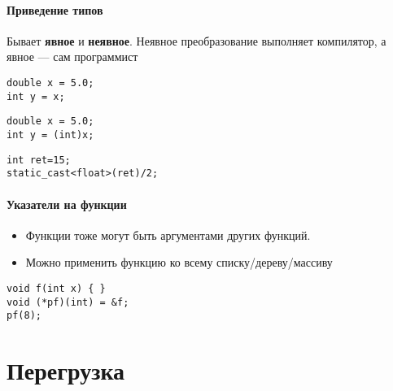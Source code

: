 \documentclass {article}
\begin{document}
\paragraph{Приведение типов\\}
Бывает {\bfseries явное} и {\bfseries неявное}. Неявное преобразование выполняет компилятор, а явное --- сам программист
\begin{lstlisting}[caption=Неявное приведение типов]
double x = 5.0;
int y = x; 
\end{lstlisting}
\begin{lstlisting}[caption=Явное приведение типов]
double x = 5.0;
int y = (int)x;
\end{lstlisting}
\begin{lstlisting}[caption=Явное приведение типов]
int ret=15;
static_cast<float>(ret)/2;
\end{lstlisting}
\paragraph{Указатели на функции}
\begin {itemize}
	\item Функции тоже могут быть аргументами других функций. 
	\item Можно применить функцию ко всему списку/дереву/массиву 
\end {itemize}
\begin{lstlisting}[caption=Реализация указателя на функцию]
void f(int x) { }
void (*pf)(int) = &f;
pf(8);
\end{lstlisting}
\section{Перегрузка}
\end{document}
